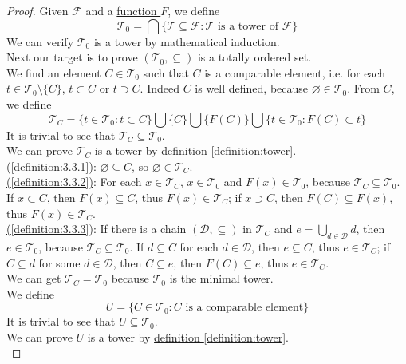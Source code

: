 \documentclass[12pt]{amsart}
\numberwithin{equation}{section}
\theoremstyle{plain} %
\theoremstyle{definition}
\theoremstyle{remark}
\begin{document}
\begin{proof}
Given $\mathcal{F}$ and a \hyperref[definition:B_star]{function $F$}, we define 
$$\mathcal{T}_0 = \bigcap \{ \mathcal{T} \subseteq  \mathcal{F}: \mathcal{T} \text{ is a tower of }\mathcal{F}\}$$
We can verify $\mathcal{T}_0$ is a tower by mathematical induction. \\
Next our target is to prove $(\mathcal{T}_0, \subseteq)$ is a totally ordered set.     \\
We find an element $C \in \mathcal{T}_0$ such that $C$ is a comparable element, i.e. for each $t \in \mathcal{T}_0 \setminus \{{C}\}$, $t \subset {C}$ or $t \supset {C}$. Indeed $C$ is well defined, because $\varnothing \in \mathcal{T}_0$. From ${C}$, we define 
$$\mathcal{T}_C = \{ t \in \mathcal{T}_0: t \subset C \} \bigcup \{ C \} \bigcup \{ F(C) \} \bigcup \{ t \in \mathcal{T}_0: F(C) \subset t \}$$
It is trivial to see that $\mathcal{T}_C \subseteq \mathcal{T}_0$. \\
We can prove $\mathcal{T}_C$ is a tower by \hyperref[definition:tower]{definition  \ref*{definition:tower}}.  \\
\hyperref[definition:3.3.1]{(\ref*{definition:3.3.1})}: $\varnothing \subseteq C$, so $\varnothing \in \mathcal{T}_C$. \\  
\hyperref[definition:3.3.2]{(\ref*{definition:3.3.2})}: For each $x \in \mathcal{T}_C$, $x \in \mathcal{T}_0$ and $F(x) \in \mathcal{T}_0$, because $\mathcal{T}_C \subseteq \mathcal{T}_0$. If $x \subset C$, then $F(x) \subseteq C$, thus $F(x) \in \mathcal{T}_C$; if $x \supset C $, then $F(C) \subseteq F(x)$, thus $F(x) \in \mathcal{T}_C$. \\
\hyperref[definition:3.3.3]{(\ref*{definition:3.3.3})}: If there is a chain $(\mathcal{D}, \subseteq)$ in $\mathcal{T}_C$ and $e = \bigcup_{d \in \mathcal{D}}d $, then $e \in \mathcal{T}_0$, because $\mathcal{T}_C \subseteq \mathcal{T}_0$. If $d \subseteq C$ for each $d \in \mathcal{D}$, then $e \subseteq C$, thus $e \in \mathcal{T}_C$; if $C \subseteq d$ for some $d \in \mathcal{D}$, then $C \subseteq e$, then $F(C) \subseteq e$, thus $e \in \mathcal{T}_C$. \\
We can get $\mathcal{T}_C = \mathcal{T}_0$ because $\mathcal{T}_0$ is the minimal tower.  \\
We define \\
$$U = \{ C \in \mathcal{T}_0: C \text{ is a comparable element}\}$$
It is trivial to see that $U \subseteq \mathcal{T}_0$. \\
We can prove $U$ is a tower by \hyperref[definition:tower]{definition  \ref*{definition:tower}}.  \\

\end{proof}
\end{document}
